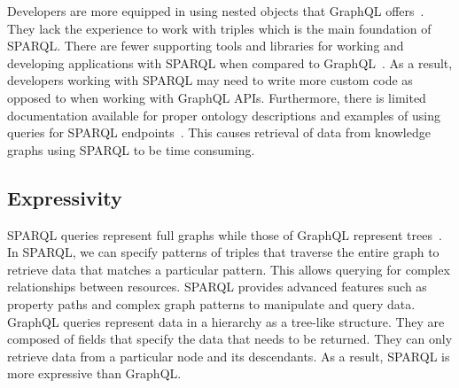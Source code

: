 Developers are more equipped in using nested objects that GraphQL offers~\cite{Taelman2018}. They lack the experience to work with triples which is the main foundation of SPARQL. There are fewer supporting tools and libraries for working and developing applications with SPARQL when compared to GraphQL~\cite{Taelman2018}. As a result, developers working with SPARQL may need to write more custom code as opposed to when working with GraphQL APIs. Furthermore, there is limited documentation available for proper ontology descriptions and examples of using queries for SPARQL endpoints~\cite{Angele2022}. This causes retrieval of data from knowledge graphs using SPARQL to be time consuming.



\subsection{Expressivity}
SPARQL queries represent full graphs while those of GraphQL represent trees~\cite{Taelman2018}. In SPARQL, we can specify patterns of triples that traverse the entire graph to retrieve data that matches a particular pattern. This allows querying for complex relationships between resources. SPARQL provides advanced features such as property paths and complex graph patterns to manipulate and query data. GraphQL queries represent data in a hierarchy as a tree-like structure. They are composed of fields that specify the data that needs to be returned. They can only retrieve data from a particular node and its descendants. As a result, SPARQL is more expressive than GraphQL.


